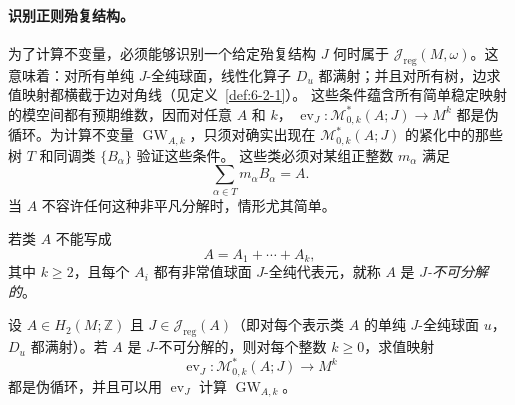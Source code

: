 \paragraph{识别正则殆复结构。}
为了计算不变量，必须能够识别一个给定殆复结构 $J$ 何时属于
$\mathcal J_{\mathrm{reg}}(M,\omega)$。这意味着：对所有单纯 $J$-全纯球面，线性化算子
$D_u$ 都满射；并且对所有树，边求值映射都横截于边对角线（见定义~\ref{def:6-2-1}）。
这些条件蕴含所有简单稳定映射的模空间都有预期维数，因而对任意 $A$ 和 $k$，
$\operatorname{ev}_J:\mathcal M^*_{0,k}(A;J)\to M^k$ 都是伪循环。为计算不变量
$\operatorname{GW}_{A,k}$，只须对确实出现在
$\mathcal M^*_{0,k}(A;J)$ 的紧化中的那些树 $T$ 和同调类 $\{B_\alpha\}$ 验证这些条件。
这些类必须对某组正整数 $m_\alpha$ 满足
\[
  \sum_{\alpha\in T}m_\alpha B_\alpha=A.
\]
当 $A$ 不容许任何这种非平凡分解时，情形尤其简单。

\begin{definition}\label{def:7-1-7}
若类 $A$ 不能写成
\[
  A=A_1+\cdots+A_k,
\]
其中 $k\ge2$，且每个 $A_i$ 都有非常值球面 $J$-全纯代表元，就称 $A$ 是
\emph{$J$-不可分解的}。
\end{definition}

\begin{lemma}\label{lem:7-1-8}
设 $A\in H_2(M;\mathbb Z)$ 且 $J\in\mathcal J_{\mathrm{reg}}(A)$（即对每个表示类
$A$ 的单纯 $J$-全纯球面 $u$，$D_u$ 都满射）。若 $A$ 是 $J$-不可分解的，则对每个整数
$k\ge0$，求值映射
\[
  \operatorname{ev}_J:\mathcal M^*_{0,k}(A;J)\longrightarrow M^k
\]
都是伪循环，并且可以用 $\operatorname{ev}_J$ 计算 $\operatorname{GW}_{A,k}$。
\end{lemma}

